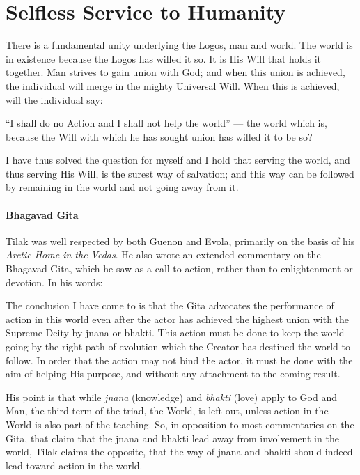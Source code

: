\section{Selfless Service to Humanity}

\begin{quotex}
There is a fundamental unity underlying the Logos, man and world. The world is in existence because the Logos has willed it so. It is His Will that holds it together. Man strives to gain union with God; and when this union is achieved, the individual will merge in the mighty Universal Will. When this is achieved, will the individual say:

``I shall do no Action and I shall not help the world'' --- the world which is, because the Will with which he has sought union has willed it to be so?

I have thus solved the question for myself and I hold that serving the world, and thus serving His Will, is the surest way of salvation; and this way can be followed by remaining in the world and not going away from it.
\end{quotex}


\paragraph{Bhagavad Gita}


Tilak was well respected by both Guenon and Evola, primarily on the basis of his \emph{Arctic Home in the Vedas}. He also wrote an extended commentary on the Bhagavad Gita, which he saw as a call to action, rather than to enlightenment or devotion. In his words:

\begin{quotex}
The conclusion I have come to is that the Gita advocates the performance of action in this world even after the actor has achieved the highest union with the Supreme Deity by jnana or bhakti. This action must be done to keep the world going by the right path of evolution which the Creator has destined the world to follow. In order that the action may not bind the actor, it must be done with the aim of helping His purpose, and without any attachment to the coming result.
\end{quotex}


His point is that while \emph{jnana} (knowledge) and \emph{bhakti} (love) apply to God and Man, the third term of the triad, the World, is left out, unless action in the World is also part of the teaching. So, in opposition to most commentaries on the Gita, that claim that the jnana and bhakti lead away from involvement in the world, Tilak claims the opposite, that the way of jnana and bhakti should indeed lead toward action in the world.

